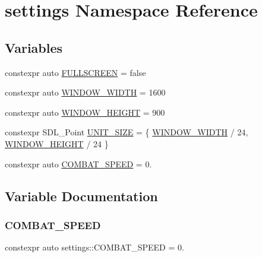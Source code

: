 \hypertarget{namespacesettings}{}\section{settings Namespace Reference}
\label{namespacesettings}
\subsection*{Variables}
\begin{DoxyCompactItemize}
\item 
constexpr auto \hyperlink{namespacesettings_aa05feb8f229f865ee428b631438be8df}{F\+U\+L\+L\+S\+C\+R\+E\+EN} = false
\item 
constexpr auto \hyperlink{namespacesettings_a5255872d9cf740d82e3eea81b7227675}{W\+I\+N\+D\+O\+W\+\_\+\+W\+I\+D\+TH} = 1600
\item 
constexpr auto \hyperlink{namespacesettings_a32b0b7be52919e9ff7038a202ab8a9bb}{W\+I\+N\+D\+O\+W\+\_\+\+H\+E\+I\+G\+HT} = 900
\item 
constexpr S\+D\+L\+\_\+\+Point \hyperlink{namespacesettings_af59a3a8d7b86c3b3f5ea35ef478e3505}{U\+N\+I\+T\+\_\+\+S\+I\+ZE} = \{ \hyperlink{namespacesettings_a5255872d9cf740d82e3eea81b7227675}{W\+I\+N\+D\+O\+W\+\_\+\+W\+I\+D\+TH} / 24, \hyperlink{namespacesettings_a32b0b7be52919e9ff7038a202ab8a9bb}{W\+I\+N\+D\+O\+W\+\_\+\+H\+E\+I\+G\+HT} / 24 \}
\item 
constexpr auto \hyperlink{namespacesettings_a42b95f3b0fc2023e5e6248474c14fb0f}{C\+O\+M\+B\+A\+T\+\_\+\+S\+P\+E\+ED} = 0.
\end{DoxyCompactItemize}


\subsection{Variable Documentation}
\mbox{\label{namespacesettings_a42b95f3b0fc2023e5e6248474c14fb0f}} 
\subsubsection{\texorpdfstring{C\+O\+M\+B\+A\+T\+\_\+\+S\+P\+E\+ED}{COMBAT\_SPEED}}
{\footnotesize\ttfamily constexpr auto settings\+::\+C\+O\+M\+B\+A\+T\+\_\+\+S\+P\+E\+ED = 0.}

